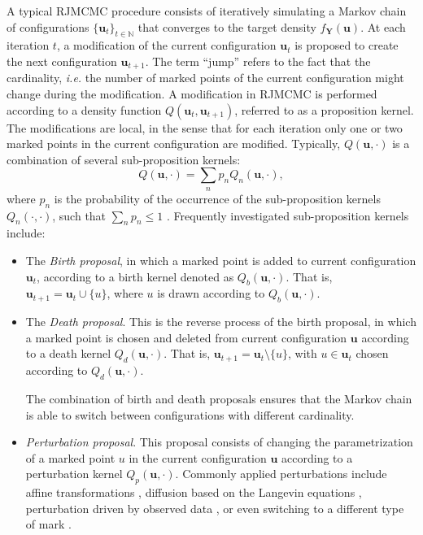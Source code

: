 \documentclass[journal]{IEEEtran}
\begin{document}
A typical RJMCMC procedure consists of iteratively simulating a Markov
chain of configurations $\{ \mathbf{u}_t \}_{t \in \mathbb{N}}$ that
converges to the target density $f_{\mathbf{Y}}(\mathbf{u})$. At each
iteration $t$, a modification of the current configuration
$\mathbf{u}_t$ is proposed to create the next configuration
$\mathbf{u}_{t+1}$. The term ``jump'' refers to the fact that the
cardinality, \textit{i.e.} the number of marked points of the current
configuration might change during the modification. A modification in
RJMCMC is performed according to a density function
$Q(\mathbf{u}_t, \mathbf{u}_{t+1})$, referred to as a proposition
kernel. The modifications are local, in the sense that for each
iteration only one or two marked points in the current configuration
are modified. Typically, $Q(\mathbf{u}, \cdot)$ is a combination of
several sub-proposition kernels:
\begin{equation}
  \label{eq:sub-kernels}
  Q(\mathbf{u}, \cdot) = \sum_n p_n Q_n (\mathbf{u}, \cdot),
\end{equation}
where $p_n$ is the probability of the occurrence of the
sub-proposition kernels $Q_n(\cdot, \cdot)$, such that
$\sum_n p_n \le 1$ \cite{descombes2013stochastic}
\cite{verdie2014detecting}. Frequently investigated sub-proposition
kernels include:

\begin{itemize}

\item The \textit{Birth proposal}, in which a marked point is added to
  current configuration $\mathbf{u}_t$, according to a birth kernel
  denoted as $Q_{b}(\mathbf{u}, \cdot)$. That is,
  $\mathbf{u}_{t+1} = \mathbf{u}_t \cup \{u\}$, where $u$ is drawn
  according to $Q_{b}(\mathbf{u}, \cdot)$.

\item The \textit{Death proposal}. This is the reverse process of the
  birth proposal, in which a marked point is chosen and deleted from
  current configuration $\mathbf{u}$ according to a death kernel
  $Q_{d}(\mathbf{u}, \cdot)$. That is,
  $\mathbf{u}_{t+1} = \mathbf{u}_t \setminus \{u\}$, with
  $u \in \mathbf{u}_t$ chosen according to $Q_{d}(\mathbf{u}, \cdot)$.

  The combination of birth and death proposals ensures that the Markov
  chain is able to switch between configurations with different
  cardinality.

\item \textit{Perturbation proposal}. This proposal consists of
  changing the parametrization of a marked point $u$ in the current
  configuration $\mathbf{u}$ according to a perturbation kernel
  $Q_{p}(\mathbf{u}, \cdot)$. Commonly applied perturbations include
  affine transformations \cite{descombes2013stochastic}, diffusion
  based on the Langevin equations \cite{lafarge2010geometric},
  perturbation driven by observed data \cite{tu2002image}, or even
  switching to a different type of mark \cite{lafarge2010geometric}
  \cite{green1995reversible}.

\end{itemize}
\end{document}
